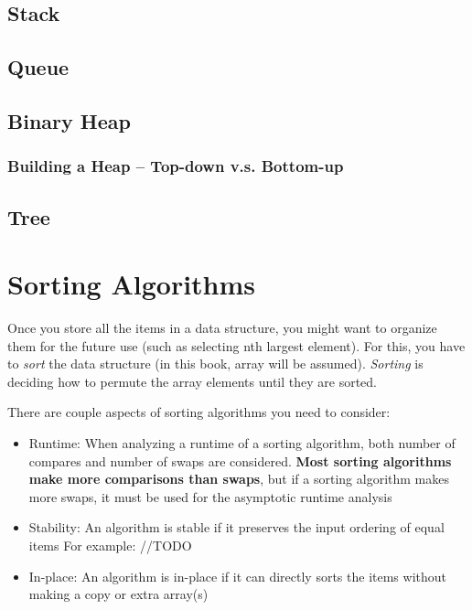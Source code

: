 \documentclass{report}
\begin{document}
\section{Stack}

\section{Queue}

\section{Binary Heap}

\subsection{Building a Heap -- Top-down v.s. Bottom-up}

\section{Tree}


\chapter{Sorting Algorithms}

Once you store all the items in a data structure, you might want to organize them for the future use (such as selecting nth largest element). For this, you have to \textit{sort} the data structure (in this book, array will be assumed). \textit{Sorting} is deciding how to permute the array elements until they are sorted.

There are couple aspects of sorting algorithms you need to consider:

\begin{itemize}
  \item Runtime: When analyzing a runtime of a sorting algorithm, both number of compares and number of swaps are considered. \textbf{Most sorting algorithms make more comparisons than swaps}, but if a sorting algorithm makes more swaps, it must be used for the asymptotic runtime analysis
  \item Stability: An algorithm is stable if it preserves the input ordering of equal items For example: //TODO
  \item In-place: An algorithm is in-place if it can directly sorts the items without making a copy or extra array(s)
\end{itemize}
\end{document}
